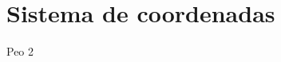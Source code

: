 \documentclass[../main_ej.tex]{subfiles}
\begin{document}
\section{Sistema de coordenadas}
Peo 2
 
\end{document}
